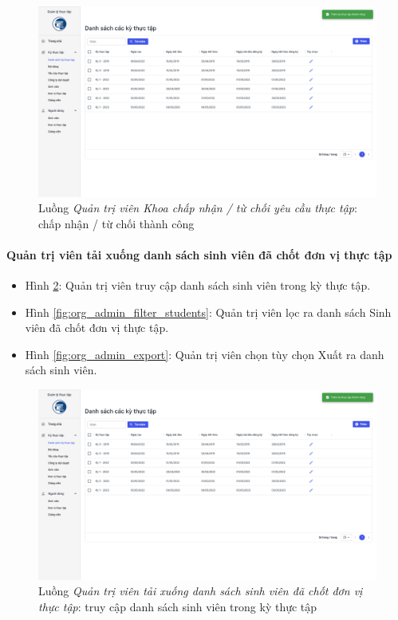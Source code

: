 \documentclass[./../main.tex]{subfiles}
\begin{document}
\begin{figure}[]
	\includegraphics[width=\linewidth]{./images/image55.png} %
	\caption{Luồng \emph{Quản trị viên Khoa chấp nhận / từ chối yêu cầu thực tập}: chấp nhận / từ chối thành công}
	\label{fig:org_admin_approve_reject_success}
\end{figure}

\paragraph*{Quản trị viên tải xuống danh sách sinh viên đã chốt đơn vị thực tập}

\begin{itemize}
	\item Hình \ref{fig:org_admin_access_list_intern_students}: Quản trị viên truy cập danh sách sinh viên trong kỳ thực tập. 
	\item Hình \ref{fig:org_admin_filter_students}: Quản trị viên lọc ra danh sách Sinh viên đã chốt đơn vị thực tập.
	\item Hình \ref{fig:org_admin_export}: Quản trị viên chọn tùy chọn Xuất ra danh sách sinh viên.
\end{itemize}

\begin{figure}[]
	\includegraphics[width=\linewidth]{./images/image55.png} %
	\caption{Luồng \emph{Quản trị viên tải xuống danh sách sinh viên đã chốt đơn vị thực tập}: truy cập danh sách sinh viên trong kỳ thực tập}
	\label{fig:org_admin_access_list_intern_students}
\end{figure}
\end{document}
